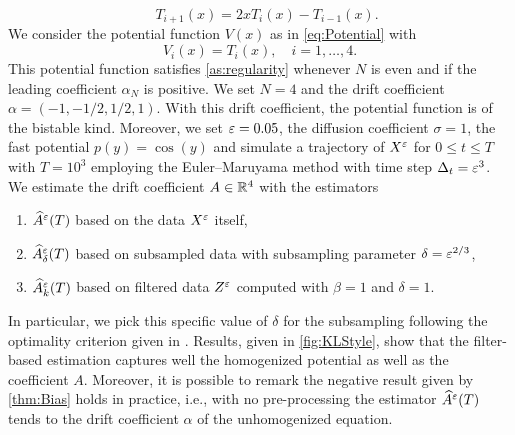\documentclass[review,onefignum,onetabnum]{siamonline190516}
\begin{document}
\begin{equation}
 \quad T_{i+1}(x) = 2xT_i(x) - T_{i-1}(x).
\end{equation}
We consider the potential function $V(x)$ as in \eqref{eq:Potential} with
\begin{equation}
V_i(x) = T_i(x), \quad i =1, \ldots, 4.
\end{equation}
This potential function satisfies \cref{as:regularity} whenever $N$ is even and if the leading coefficient $\alpha_N$ is positive. We set $N = 4$ and the drift coefficient $\alpha = (-1, -1/2, 1/2, 1)$. With this drift coefficient, the potential function is of the bistable kind. Moreover, we set $\varepsilon = 0.05$, the diffusion coefficient $\sigma = 1$, the fast potential $p(y) = \cos(y)$ and simulate a trajectory of $X^\varepsilon$ for $0 \leq t \leq T$ with $T = 10^3$ employing the Euler--Maruyama method with time step $\Delta_t = \varepsilon^3$. We estimate the drift coefficient $A \in \mathbb{R}^4$ with the estimators
\begin{enumerate}
	\item $\widehat A^\varepsilon(T)$ based on the data $X^\varepsilon$ itself,
	\item $\widehat A^\varepsilon_\delta(T)$ based on subsampled data with subsampling parameter $\delta = \varepsilon^{2/3}$,
	\item $\widehat A^\varepsilon_k(T)$ based on filtered data $Z^\varepsilon$ computed with $\beta = 1$ and $\delta = 1$.
\end{enumerate}
In particular, we pick this specific value of $\delta$ for the subsampling following the optimality criterion given in \cite{PaS07}. Results, given in \cref{fig:KLStyle}, show that the filter-based estimation captures well the homogenized potential as well as the coefficient $A$. Moreover, it is possible to remark the negative result given by \cref{thm:Bias} holds in practice, i.e., with no pre-processing the estimator $\widehat A^\varepsilon(T)$ tends to the drift coefficient $\alpha$ of the unhomogenized equation.
\end{document}

